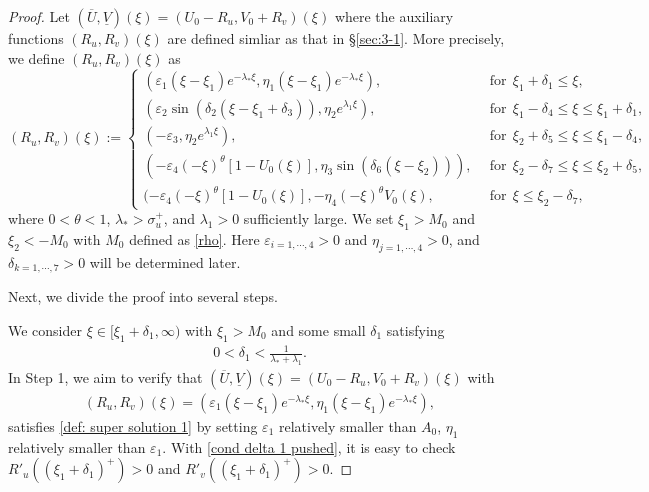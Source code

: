 \documentclass[11pt,a4paper]{article}
\numberwithin{equation}{section}
\numberwithin{figure}{section}
\newcommand\bea{\begin{eqnarray}}
\newcommand\eea{\end{eqnarray}}
\newcommand\beaa{\begin{eqnarray*}}
\newcommand\eeaa{\end{eqnarray*}}
\begin{document}
\begin{proof}
Let $(\overline U,\underline V)(\xi)=(U_0-R_u,V_0+R_v)(\xi)$ where  the auxiliary functions $(R_u,R_v)(\xi)$ are defined simliar as that in \S \ref{sec:3-1}. More precisely, we  define $(R_u,R_v)(\xi)$ as 
\begin{equation*}
(R_u,R_v)(\xi):=\begin{cases}
(\varepsilon_1(\xi-\xi_1) e^{-\lambda_*\xi},\eta_1 (\xi-\xi_1)e^{-\lambda_*\xi}),&\ \ \mbox{for}\ \ \xi_1+\delta_1\le\xi,\\
(\varepsilon_2\sin(\delta_2(\xi-\xi_1+\delta_3)),\eta_2e^{\lambda_{1}\xi}),&\ \ \mbox{for}\ \ \xi_1-\delta_4\le\xi\le\xi_{1}+\delta_1,\\
(-\varepsilon_3,\eta_2e^{\lambda_{1}\xi}),&\ \ \mbox{for}\ \ \xi_2+\delta_5\le\xi\le\xi_1-\delta_4,\\
(-\varepsilon_4(-\xi)^{\theta}[1-U_0(\xi)],\eta_3\sin(\delta_6(\xi-\xi_2))),&\ \ \mbox{for}\ \ \xi_2-\delta_7\le\xi\le\xi_2+\delta_5,\\
(-\varepsilon_4(-\xi)^{\theta}[1-U_0(\xi)],-\eta_4(-\xi)^{\theta}V_0(\xi),&\ \ \mbox{for}\ \ \xi\le\xi_2-\delta_7,
\end{cases}
\end{equation*}
where
$0<\theta<1$, $\lambda_*>\sigma_u^+$, 
and $\lambda_{1}>0$ sufficiently large.
We set $\xi_1>M_0$ and $\xi_2<-M_0$ with $M_0$ defined as \eqref{rho}. Here $\varepsilon_{i=1,\cdots,4}>0$ and $\eta_{j=1,\cdots,4}>0$, and $\delta_{k=1,\cdots,7}>0$ will be determined later.





\medskip

Next, we  divide the proof into several steps.
\medskip

 We consider $\xi\in[\xi_{1}+\delta_1,\infty)$ with $\xi_1>M_0$  and  some small $\delta_1$ satisfying
\bea\label{cond delta 1 pushed}
0<\delta_1<\frac{1}{\lambda_*+\lambda_1}.
\eea
In Step 1, we aim to verify that $(\overline U,\underline V)(\xi)=(U_0-R_u,V_0+R_v)(\xi)$ with
\beaa
(R_u,R_v)(\xi)=(\varepsilon_1(\xi-\xi_1)e^{-\lambda_*\xi},\eta_1(\xi-\xi_{1}) e^{-\lambda_*\xi}),
\eeaa
satisfies \eqref{def: super solution 1} by setting $\varepsilon_1$ relatively smaller than $A_0$, $\eta_1$ relatively smaller than $\varepsilon_1$.
With \eqref{cond delta 1 pushed}, it is easy to check $R'_u((\xi_1+\delta_1)^+)>0$  and $R'_v((\xi_1+\delta_1)^+)>0$.


\end{proof}
\end{document}

